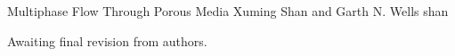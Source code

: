               {Multiphase Flow Through Porous Media}
              {Xuming Shan and Garth N. Wells}
              {shan}

Awaiting final revision from authors.

